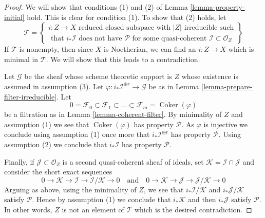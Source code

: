 \documentclass[10pt,a4paper]{amsart}
\theoremstyle{plain}
\theoremstyle{definition}
\theoremstyle{remark}
\numberwithin{equation}{subsection}
\def\Coker{\mathop{\mathrm{Coker}}}
\begin{document}
\begin{proof}
We will show that conditions (1) and (2) of
Lemma \ref{lemma-property-initial} hold. This is clear for condition (1).
To show that (2) holds, let
$$
\mathcal{T} =
\left\{
\begin{matrix}
i : Z \to X \text{ reduced closed subspace with }|Z|\text{ irreducible such}\\
\text{ that }i_*\mathcal{I}\text{ does not have }\mathcal{P}
\text{ for some quasi-coherent }\mathcal{I} \subset \mathcal{O}_Z
\end{matrix}
\right\}
$$
If $\mathcal{T}$ is nonempty, then since $X$ is Noetherian, we can
find an $i : Z \to X$ which is minimal in $\mathcal{T}$. We will show
that this leads to a contradiction.

\medskip\noindent
Let $\mathcal{G}$ be the sheaf whose scheme theoretic support is $Z$ whose
existence is assumed in assumption (3). Let
$\varphi : i_*\mathcal{I}^{\oplus r} \to \mathcal{G}$ be as in
Lemma \ref{lemma-prepare-filter-irreducible}. Let
$$
0 = \mathcal{F}_0 \subset \mathcal{F}_1 \subset
\ldots \subset \mathcal{F}_m = \Coker(\varphi)
$$
be a filtration as in Lemma \ref{lemma-coherent-filter}. By minimality
of $Z$ and assumption (1) we see that $\Coker(\varphi)$ has
property $\mathcal{P}$. As $\varphi$ is injective we conclude using
assumption (1) once more that $i_*\mathcal{I}^{\oplus r}$ has property
$\mathcal{P}$. Using assumption (2) we conclude that $i_*\mathcal{I}$
has property $\mathcal{P}$.

\medskip\noindent
Finally, if $\mathcal{J} \subset \mathcal{O}_Z$ is a second quasi-coherent
sheaf of ideals, set $\mathcal{K} = \mathcal{I} \cap \mathcal{J}$
and consider the short exact sequences
$$
0 \to \mathcal{K} \to \mathcal{I} \to \mathcal{I}/\mathcal{K} \to 0
\quad
\text{and}
\quad
0 \to \mathcal{K} \to \mathcal{J} \to \mathcal{J}/\mathcal{K} \to 0
$$
Arguing as above, using the minimality of $Z$, we see that
$i_*\mathcal{I}/\mathcal{K}$ and $i_*\mathcal{J}/\mathcal{K}$
satisfy $\mathcal{P}$. Hence by assumption (1) we conclude that
$i_*\mathcal{K}$ and then $i_*\mathcal{J}$ satisfy $\mathcal{P}$.
In other words, $Z$ is not an element of $\mathcal{T}$ which is
the desired contradiction.
\end{proof}
\end{document}
